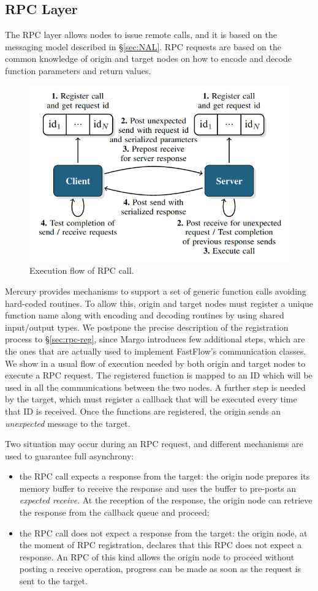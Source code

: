 \subsection{RPC Layer}
The RPC layer allows nodes to issue remote calls, and it is based on the messaging model described in \S\ref{sec:NAL}. RPC requests are based on the common knowledge of origin and target nodes on how to encode and decode function parameters and return values.\newline
\begin{figure}[H]
    \centering
    \includegraphics[width=0.6\linewidth]{res/rpc-flow.png}
    \caption{Execution flow of RPC call. }
    \label{fig:rpc-flow}
\end{figure}

Mercury provides mechanisms to support a set of generic function calls avoiding hard-coded routines. To allow this, origin and target nodes must register a unique function name along with encoding and decoding routines by using shared input/output types. We postpone the precise description of the registration process to \S\ref{sec:rpc-reg}, since Margo introduces few additional steps, which are the ones that are actually used to implement FastFlow's communication classes. We show in  a usual flow of execution needed by both origin and target nodes to execute a RPC request. The registered function is mapped to an ID which will be used in all the communications between the two nodes. A further step is needed by the target, which must register a callback that will be executed every time that ID is received. Once the functions are registered, the origin sends an \textit{unexpected} message to the target.\newline

Two situation may occur during an RPC request, and different mechanisms are used to guarantee full asynchrony:
\begin{itemize}
    \item the RPC call expects a response from the target: the origin node prepares its memory buffer to receive the response and uses the buffer to pre-posts an \textit{expected receive}. At the reception of the response, the origin node can retrieve the response from the callback queue and proceed;
    \item the RPC call does not expect a response from the target: the origin node, at the moment of RPC registration, declares that this RPC does not expect a response. An RPC of this kind allows the origin node to proceed without posting a receive operation, progress can be made as soon as the request is sent to the target.
\end{itemize}

